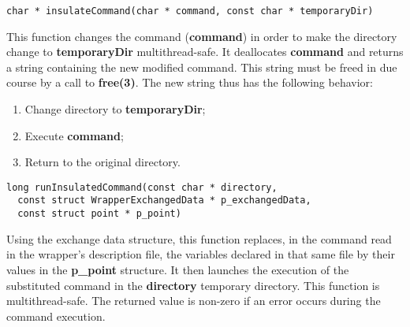 \lstset{language=C++, basicstyle=\normalsize}
\begin{lstlisting}[frame=TRBL]
  char * insulateCommand(char * command, const char * temporaryDir)
\end{lstlisting}

This function changes the command ({\bf command}) in order to make the directory change to {\bf temporaryDir} multithread-safe. It deallocates {\bf command} and returns a string containing the new modified command. This string must be freed in due course by a call to {\bf free(3)}. The new string thus has the following behavior:

\begin{enumerate}
\item Change directory to {\bf temporaryDir};
\item Execute {\bf command};
\item Return to the original directory.
\end{enumerate}

\lstset{language=C++, basicstyle=\normalsize}
\begin{lstlisting}[frame=TRBL]
  long runInsulatedCommand(const char * directory,
  const struct WrapperExchangedData * p_exchangedData,
  const struct point * p_point)
\end{lstlisting}

Using the exchange data structure, this function replaces, in the command read in the wrapper's description file, the variables declared in that same file by their values in the {\bf p\_point} structure. It then launches the execution of the substituted command in the {\bf directory} temporary directory. This function is multithread-safe. The returned value is non-zero if an error occurs during the command execution.
